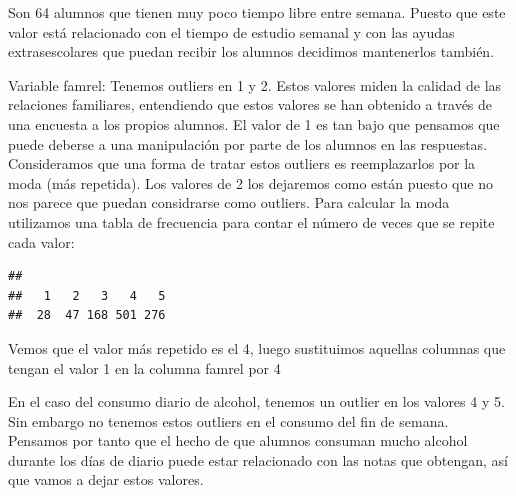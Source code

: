 \documentclass[]{article}
\newenvironment{Shaded}{\begin{snugshade}}{\end{snugshade}}
\newcommand{\DecValTok}[1]{\textcolor[rgb]{0.86,0.86,0.80}{#1}}
\newcommand{\KeywordTok}[1]{\textcolor[rgb]{0.94,0.87,0.69}{#1}}
\newcommand{\NormalTok}[1]{\textcolor[rgb]{0.80,0.80,0.80}{#1}}
\newcommand{\OperatorTok}[1]{\textcolor[rgb]{0.94,0.94,0.82}{#1}}
\newcommand{\StringTok}[1]{\textcolor[rgb]{0.80,0.58,0.58}{#1}}
\begin{document}
Son 64 alumnos que tienen muy poco tiempo libre entre semana. Puesto que
este valor está relacionado con el tiempo de estudio semanal y con las
ayudas extrasescolares que puedan recibir los alumnos decidimos
mantenerlos también.

Variable famrel: Tenemos outliers en 1 y 2. Estos valores miden la
calidad de las relaciones familiares, entendiendo que estos valores se
han obtenido a través de una encuesta a los propios alumnos. El valor de
1 es tan bajo que pensamos que puede deberse a una manipulación por
parte de los alumnos en las respuestas. Consideramos que una forma de
tratar estos outliers es reemplazarlos por la moda (más repetida). Los
valores de 2 los dejaremos como están puesto que no nos parece que
puedan considrarse como outliers. Para calcular la moda utilizamos una
tabla de frecuencia para contar el número de veces que se repite cada
valor:

\begin{Shaded}
\end{Shaded}

\begin{verbatim}
## 
##   1   2   3   4   5 
##  28  47 168 501 276
\end{verbatim}

Vemos que el valor más repetido es el 4, luego sustituimos aquellas
columnas que tengan el valor 1 en la columna famrel por 4

\begin{Shaded}
\end{Shaded}

En el caso del consumo diario de alcohol, tenemos un outlier en los
valores 4 y 5. Sin embargo no tenemos estos outliers en el consumo del
fin de semana. Pensamos por tanto que el hecho de que alumnos consuman
mucho alcohol durante los días de diario puede estar relacionado con las
notas que obtengan, así que vamos a dejar estos valores.

\begin{Shaded}
\end{Shaded}
\end{document}
